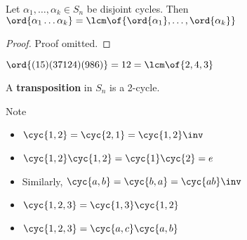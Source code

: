 \begin{theorem}
    Let $\alpha_1, \dots, \alpha_k \in S_n$ be disjoint cycles. Then $\ord{\alpha_1\dots\alpha_k} = \lcm\of{\ord{\alpha_1}, \dots, \ord{\alpha_k}}$
\end{theorem}
\begin{proof}
    Proof omitted.
\end{proof}

\begin{example}
    $\ord{(15)(37124)(986)} = 12 = \lcm\of{2,4,3}$
\end{example}

\begin{definition}[a transposition]
    A \textbf{transposition} in $S_n$ is a 2-cycle.
\end{definition}

\begin{example}[transpositions]
    Note
    \begin{itemize}
        \item $\cyc{1,2} = \cyc{2,1} = \cyc{1,2}\inv$
        \item $\cyc{1,2}\cyc{1,2} = \cyc{1}\cyc{2} = e$
        \item Similarly, $\cyc{a,b} = \cyc{b,a} = \cyc{ab}\inv$
        \item $\cyc{1,2,3} = \cyc{1,3}\cyc{1,2}$
        \item $\cyc{1,2,3} = \cyc{a,c}\cyc{a,b}$
    \end{itemize}
\end{example}

